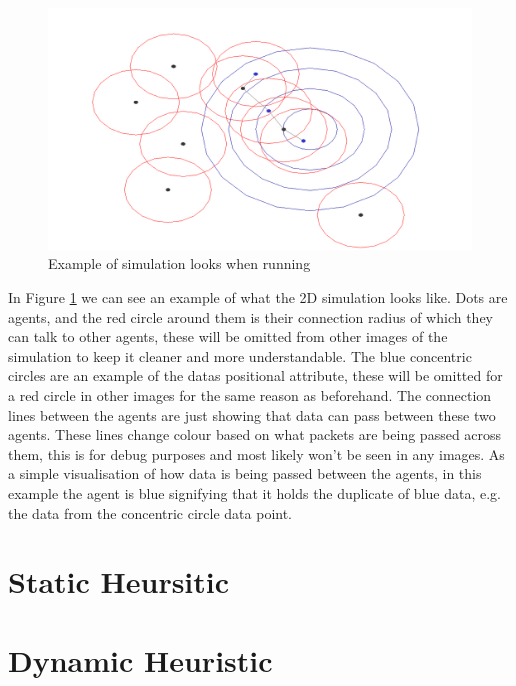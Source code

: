 \documentclass{UoYCSproject}
\begin{document}
\begin{figure}[htb]
\label{fig:Connarea}
\begin{center}
\centering
\includegraphics[width=\linewidth]{"./ExplanationImgs/Connarea.png"}
\caption{Example of simulation looks when running}
\end{center}
\end{figure}

In Figure \ref{fig:Connarea} we can see an example of what the 2D simulation looks like.
Dots are agents, and the red circle around them is their connection radius of which they can talk to other agents, these will be omitted from other images of the simulation to keep it cleaner and more understandable.
The blue concentric circles are an example of the datas positional attribute, these will be omitted for a red circle in other images for the same reason as beforehand.
The connection lines between the agents are just showing that data can pass between these two agents. These lines change colour based on what packets are being passed across them, this is for debug purposes and most likely won’t be seen in any images. 
As a simple visualisation of how data is being passed between the agents, in this example the agent is blue signifying that it holds the duplicate of blue data, e.g. the data from the  concentric circle data point.



\section{Static Heursitic}
\label{sec:Simple2}


\section{Dynamic Heuristic}
\label{sec:Simple3}
\end{document}
